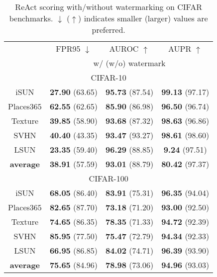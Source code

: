 \documentclass{article}
\begin{document}
\begin{table}[t]
\parbox{.47\linewidth}{
\centering
\caption{ReAct scoring with/without watermarking on CIFAR benchmarks. $\downarrow$ ($\uparrow$) indicates smaller (larger) values are preferred.} \label{tab: react}
\vspace{5pt}
\scriptsize
{
\begin{tabular}{c|ccc}
\toprule[1.5pt]
                   & FPR95 $\downarrow$     & AUROC $\uparrow$       & AUPR $\uparrow$      \\
                   \cline{2-4} 
\multirow{-2}{*}{} & \multicolumn{3}{c}{w/ (w/o) watermark} \\
\midrule[0.6pt]
\multicolumn{4}{c}{\cellcolor{greyL}CIFAR-10} \\
\midrule[0.6pt]
iSUN               & \textbf{27.90} (63.65) & \textbf{95.73} (87.54) & \textbf{99.13} (97.17) \\ 
Places$365$        & \textbf{62.55} (62.65) & \textbf{85.90} (86.98) & \textbf{96.50} (96.74) \\ 
Texture            & \textbf{39.85} (58.90) & \textbf{93.68} (87.32) & \textbf{98.63} (96.86) \\ 
SVHN               & \textbf{40.40} (43.35) & \textbf{93.47} (93.27) & \textbf{98.61} (98.60) \\ 
LSUN             & \textbf{23.35} (59.40) & \textbf{96.29} (88.85) & \textbf{9.24} (97.51) \\ 
\midrule
\textbf{average}   & \textbf{38.91} (57.59) & \textbf{93.01} (88.79) & \textbf{80.42} (97.37) \\  \midrule[1pt]
\multicolumn{4}{c}{\cellcolor{greyL}CIFAR-100} \\
\midrule[1pt]
iSUN               & \textbf{68.05} (86.40) & \textbf{83.91} (75.31) & \textbf{96.35} (94.04) \\ 
Places$365$        & \textbf{82.65} (87.70) & \textbf{73.18} (71.20) & \textbf{93.00} (92.50) \\ 
Texture            & \textbf{74.65} (86.35) & \textbf{78.35} (71.33) & \textbf{94.72} (92.39) \\ 
SVHN               & \textbf{85.95} (77.50) & \textbf{75.47} (72.79) & \textbf{94.34} (92.33) \\ 
LSUN               & \textbf{66.95} (86.85) & \textbf{84.02} (74.71) & \textbf{96.39} (93.90) \\ 
\midrule
\textbf{average}   & \textbf{75.65} (84.96) & \textbf{78.98} (73.06) & \textbf{94.96} (93.03) \\  \bottomrule[1.5pt]      

\end{tabular}}}
\end{table}
\end{document}
